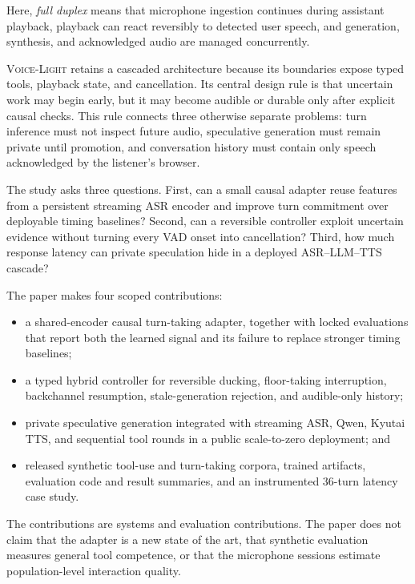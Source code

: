 \documentclass[10pt,twocolumn]{article}
\newcommand{\VoiceLight}{\textsc{Voice-Light}}
\begin{document}
Here, \emph{full duplex} means that microphone ingestion continues during assistant playback,
playback can react reversibly to detected user speech, and generation, synthesis, and acknowledged
audio are managed concurrently.

\VoiceLight{} retains a cascaded architecture because its boundaries expose typed tools, playback
state, and cancellation. Its central design rule is that uncertain work may begin early, but it may
become audible or durable only after explicit causal checks. This rule connects three otherwise
separate problems: turn inference must not inspect future audio, speculative generation must remain
private until promotion, and conversation history must contain only speech acknowledged by the
listener's browser.

The study asks three questions. First, can a small causal adapter reuse features from a persistent
streaming ASR encoder and improve turn commitment over deployable timing baselines? Second, can a
reversible controller exploit uncertain evidence without turning every VAD onset into cancellation?
Third, how much response latency can private speculation hide in a deployed ASR--LLM--TTS cascade?

The paper makes four scoped contributions:

\begin{itemize}
  \item a shared-encoder causal turn-taking adapter, together with locked evaluations that report
  both the learned signal and its failure to replace stronger timing baselines;
  \item a typed hybrid controller for reversible ducking, floor-taking interruption,
  backchannel resumption, stale-generation rejection, and audible-only history;
  \item private speculative generation integrated with streaming ASR, Qwen, Kyutai TTS, and
  sequential tool rounds in a public scale-to-zero deployment; and
  \item released synthetic tool-use and turn-taking corpora, trained artifacts, evaluation
  code and result summaries, and an instrumented 36-turn latency case study.
\end{itemize}

The contributions are systems and evaluation contributions. The paper does not claim that the
adapter is a new state of the art, that synthetic evaluation measures general tool competence, or
that the microphone sessions estimate population-level interaction quality.
\end{document}
